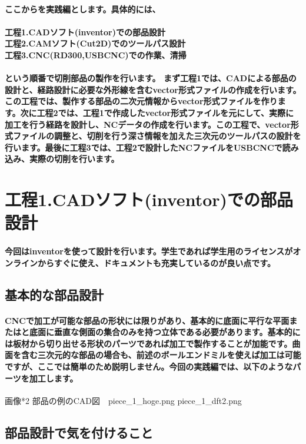 \documentclass[b5paper, 9pt, twocolumn, titlepage,openany]{jsbook}%
\begin{document}
\paragraph{ここからを実践編とします。具体的には、\\\\
工程1.CADソフト(inventor)での部品設計\\
工程2.CAMソフト(Cut2D)でのツールパス設計\\
工程3.CNC(RD300,USBCNC)での作業、清掃\\\\
という順番で切削部品の製作を行います。
まず工程1では、CADによる部品の設計と、経路設計に必要な外形線を含むvector形式ファイルの作成を行います。この工程では、製作する部品の二次元情報からvector形式ファイルを作ります。次に工程2では、工程1で作成したvector形式ファイルを元にして、実際に加工を行う経路を設計し、NCデータの作成を行います。この工程で、vector形式ファイルの調整と、切削を行う深さ情報を加えた三次元のツールパスの設計を行います。最後に工程3では、工程2で設計したNCファイルをUSBCNCで読み込み、実際の切削を行います。}

\section{工程1.CADソフト(inventor)での部品設計}
\paragraph{今回はinventorを使って設計を行います。学生であれば学生用のライセンスがオンラインからすぐに使え、ドキュメントも充実しているのが良い点です。}

\subsection{基本的な部品設計}
\paragraph{CNCで加工が可能な部品の形状には限りがあり、基本的に底面に平行な平面またはと底面に垂直な側面の集合のみを持つ立体である必要があります。基本的には板材から切り出せる形状のパーツであれば加工で製作することが加能です。曲面を含む三次元的な部品の場合も、前述のボールエンドミルを使えば加工は可能ですが、ここでは簡単のため説明しません。今回の実践編では、以下のようなパーツを加工します。}

画像*2 部品の例のCAD図　piece_1_hoge.png piece_1_dft2.png

\subsection{部品設計で気を付けること}
\end{document}
